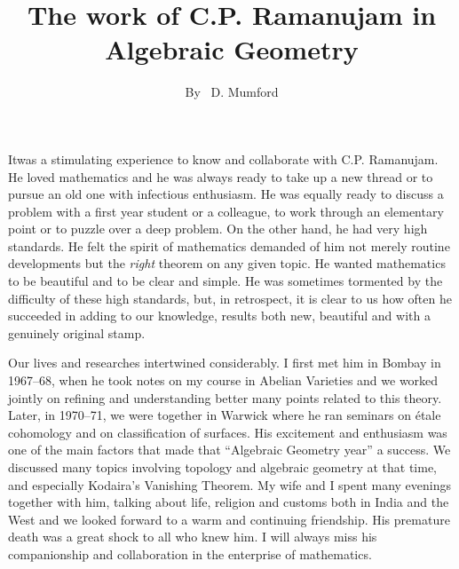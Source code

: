 \title{The work of C.P. Ramanujam in Algebraic Geometry} 

\author{By~ D. Mumford}

\date{}
\maketitle

\setcounter{page}{9}
\setcounter{pageoriginal}{7}
It\pageoriginale was a stimulating experience to know and collaborate with C.P. 
Ramanujam. He loved mathematics and he was always ready to take up a 
new thread or to pursue an old one with infectious enthusiasm. He was 
equally ready to discuss a problem with a first year student or a 
colleague, to work through an elementary point or to puzzle over a 
deep problem. On the other hand, he had very high standards. He felt 
the spirit of mathematics demanded of him not merely routine 
developments but the \emph{right} theorem on any given topic. He 
wanted mathematics to be beautiful and to be clear and simple. He was 
sometimes tormented by the difficulty of these high standards, but, in 
retrospect, it is clear to us how often he succeeded in adding to our 
knowledge, results both new, beautiful and with a genuinely original 
stamp.

Our lives and researches intertwined considerably. I first met him in 
Bombay in 1967--68, when he took notes on my course in Abelian 
Varieties and we worked jointly on refining and understanding better 
many points related to this theory. Later, in 1970--71, we were 
together in Warwick where he ran seminars on \'etale cohomology and on 
classification of surfaces. His excitement and enthusiasm was one of 
the main factors that made that ``Algebraic Geometry year'' a success. 
We discussed many topics involving topology and algebraic geometry at 
that time, and especially Kodaira's Vanishing Theorem. My wife and I 
spent many evenings together with him, talking about life, religion 
and customs both in India and the West and we looked forward to a warm 
and continuing friendship. His premature death was a great shock to 
all who knew him. I will always miss his companionship and 
collaboration in the enterprise of mathematics.

